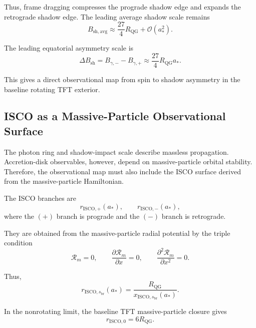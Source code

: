 Thus, frame dragging compresses the prograde shadow edge and expands the retrograde shadow edge. The leading average shadow scale remains
\begin{equation}
    \boxed{ B_{\mathrm{sh,avg}} \approx \frac{27}{4}R_{\mathrm{QG}} + \mathcal{O}(a_\ast^2). }
\end{equation}

The leading equatorial asymmetry scale is
\begin{equation}
    \boxed{ \Delta B_{\mathrm{sh}} = B_{\gamma,-}-B_{\gamma,+} \approx \frac{27}{4}R_{\mathrm{QG}}a_\ast. }
\end{equation}

This gives a direct observational map from spin to shadow asymmetry in the baseline rotating TFT exterior.

\subsection{ISCO as a Massive-Particle Observational Surface}

The photon ring and shadow-impact scale describe massless propagation. Accretion-disk observables, however, depend on massive-particle orbital stability. Therefore, the observational map must also include the ISCO surface derived from the massive-particle Hamiltonian.

The ISCO branches are
\begin{equation}
    r_{\mathrm{ISCO},+}(a_\ast), \qquad r_{\mathrm{ISCO},-}(a_\ast),
\end{equation}
where the $(+)$ branch is prograde and the $(-)$ branch is retrograde.

They are obtained from the massive-particle radial potential by the triple condition
\begin{equation}
    \mathcal{R}_m = 0, \qquad \frac{\partial\mathcal{R}_m}{\partial x} = 0, \qquad \frac{\partial^2\mathcal{R}_m}{\partial x^2} = 0.
\end{equation}

Thus,
\begin{equation}
    \boxed{ r_{\mathrm{ISCO},s_{\mathrm{br}}}(a_\ast) = \frac{R_{\mathrm{QG}}}{x_{\mathrm{ISCO},s_{\mathrm{br}}}(a_\ast)}. }
\end{equation}

In the nonrotating limit, the baseline TFT massive-particle closure gives
\begin{equation}
    \boxed{ r_{\mathrm{ISCO},0} = 6R_{\mathrm{QG}}. }
\end{equation}


